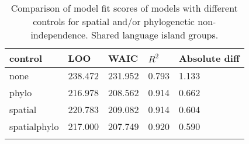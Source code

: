 
\begin{longtable}{p{2cm}p{2cm}p{2cm}p{2cm}p{2cm}}
  \toprule
control & LOO & WAIC & $R^2$ & Absolute diff \\ 
  \midrule
none & 238.472 & 231.952 & 0.793 & 1.133 \\ 
  phylo & 216.978 & 208.562 & 0.914 & 0.662 \\ 
  spatial & 220.783 & 209.082 & 0.914 & 0.604 \\ 
  spatialphylo & 217.000 & 207.749 & 0.920 & 0.590 \\ 
   \bottomrule
\caption{Comparison of model fit scores of models with different controls for spatial and/or phylogenetic non-independence. Shared language island groups.} 
\label{model_fit_score_table_medium}
\end{longtable}
